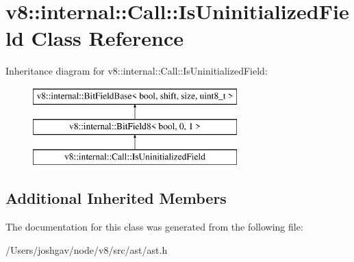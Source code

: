 \hypertarget{classv8_1_1internal_1_1_call_1_1_is_uninitialized_field}{}\section{v8\+:\+:internal\+:\+:Call\+:\+:Is\+Uninitialized\+Field Class Reference}
\label{classv8_1_1internal_1_1_call_1_1_is_uninitialized_field}
Inheritance diagram for v8\+:\+:internal\+:\+:Call\+:\+:Is\+Uninitialized\+Field\+:\begin{figure}[H]
\begin{center}
\leavevmode
\includegraphics[height=3.000000cm]{classv8_1_1internal_1_1_call_1_1_is_uninitialized_field}
\end{center}
\end{figure}
\subsection*{Additional Inherited Members}


The documentation for this class was generated from the following file\+:\begin{DoxyCompactItemize}
\item 
/\+Users/joshgav/node/v8/src/ast/ast.\+h\end{DoxyCompactItemize}
